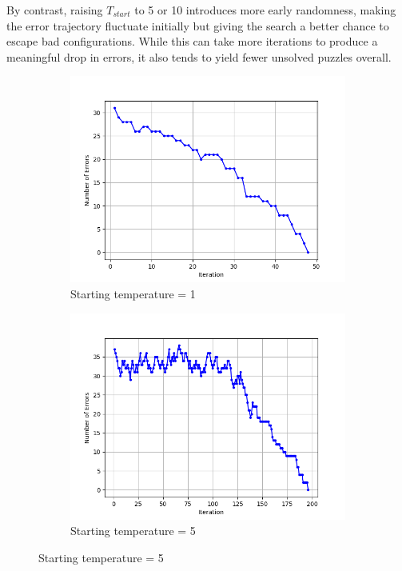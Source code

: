 \documentclass[11pt]{article}
\begin{document}
By contrast, raising $T_{start}$ to 5 or 10 introduces more early randomness,
making the error trajectory fluctuate initially but giving the search a better chance to escape bad configurations.
While this can take more iterations to produce a meaningful drop in errors, it also tends to yield fewer unsolved puzzles overall.
\begin{figure}[ht]
\centering
\begin{subfigure}{0.48\textwidth}
\centering
\includegraphics[width=\textwidth]{images/Figure_3.png}
\caption{Starting temperature = 1}
\label{fig:startT_1}
\end{subfigure}
\hfill
\begin{subfigure}{0.48\textwidth}
\centering
\includegraphics[width=\textwidth]{images/Figure_4.png}
\caption{Starting temperature = 5}
\label{fig:startT_5}
\end{subfigure}


\end{figure}
\end{document}
